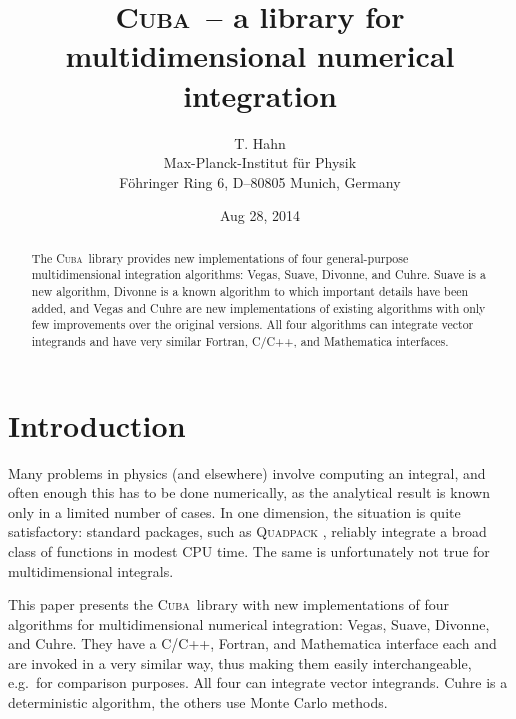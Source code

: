 \documentclass[12pt]{article}
\makeatletter
\newcommand\cuba{\textsc{Cuba}}
\newcommand\eg{e.g.\ }
\def\reportno#1{\gdef\@reportno{#1}}
\makeatother
\begin{document}
\reportno{MPP--2004--40\\hep--ph/0404043}

\title{\cuba\ -- a library for multidimensional numerical integration}

\author{T. Hahn \\
Max-Planck-Institut f\"ur Physik \\
F\"ohringer Ring 6, D--80805 Munich, Germany}

\date{Aug 28, 2014}

\maketitle

\begin{abstract}
The \cuba\ library provides new implementations of four general-purpose
multidimensional integration algorithms: Vegas, Suave, Divonne, and
Cuhre.  Suave is a new algorithm, Divonne is a known algorithm to which
important details have been added, and Vegas and Cuhre are new
implementations of existing algorithms with only few improvements over
the original versions.  All four algorithms can integrate vector
integrands and have very similar Fortran, C/C++, and Mathematica
interfaces.
\end{abstract}


\section{Introduction}

Many problems in physics (and elsewhere) involve computing an integral,
and often enough this has to be done numerically, as the analytical
result is known only in a limited number of cases.  In one dimension,
the situation is quite satisfactory: standard packages, such as
\textsc{Quadpack} \cite{quadpack}, reliably integrate a broad class of
functions in modest CPU time.  The same is unfortunately not true for
multidimensional integrals.

This paper presents the \cuba\ library with new implementations of four
algorithms for multidimensional numerical integration: Vegas, Suave,
Divonne, and Cuhre.  They have a C/C++, Fortran, and Mathematica
interface each and are invoked in a very similar way, thus making them
easily interchangeable, \eg for comparison purposes.  All four can
integrate vector integrands.  Cuhre is a deterministic algorithm, the
others use Monte Carlo methods.
\end{document}
